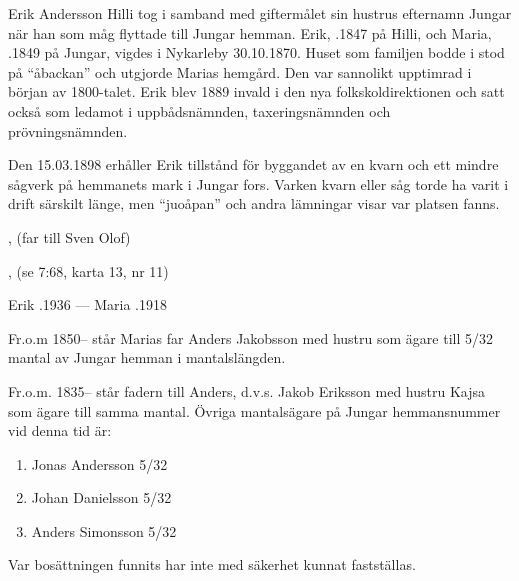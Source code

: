Erik Andersson Hilli tog i samband med giftermålet sin hustrus efternamn Jungar när han som måg flyttade till Jungar hemman. Erik, .1847 på Hilli, och Maria, .1849 på Jungar, vigdes i Nykarleby 30.10.1870. Huset som familjen bodde i stod på ``åbackan'' och utgjorde Marias hemgård. Den var sannolikt upptimrad i början av 1800-talet. Erik blev 1889 invald i den nya folkskoldirektionen och satt också som ledamot i uppbådsnämnden, taxeringsnämnden och prövningsnämnden.

Den 15.03.1898 erhåller Erik tillstånd för byggandet av en kvarn och ett mindre sågverk på hemmanets mark i Jungar fors. Varken kvarn eller såg torde ha varit i drift särskilt länge, men ``juoåpan'' och andra lämningar visar var platsen fanns.
\begin{jhchildren}
  \item {}
  \item {}
  \item {}, (far till Sven Olof)
  \item {}, (se 7:68, karta 13, nr 11)
  \item {}
  \item {}
\end{jhchildren}

Erik .1936  ---  Maria .1918

Fr.o.m 1850-- står Marias far Anders Jakobsson med hustru som ägare till 5/32 mantal av Jungar hemman i mantalslängden.

Fr.o.m. 1835-- står fadern till Anders, d.v.s. Jakob Eriksson med hustru Kajsa som ägare till samma mantal. Övriga mantalsägare på Jungar hemmansnummer vid denna tid är:
\begin{enumerate}
  \item Jonas Andersson 5/32
  \item Johan Danielsson 5/32
  \item Anders Simonsson 5/32
\end{enumerate}

Var bosättningen funnits har inte med säkerhet kunnat fastställas.



